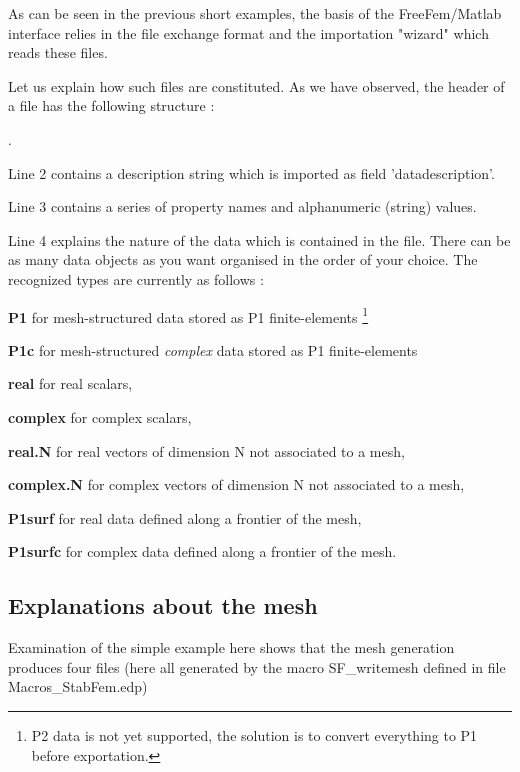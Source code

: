 As can be seen in the previous short examples, the basis of the FreeFem/Matlab interface relies in the file exchange format 
and the importation "wizard"   which reads these files.

Let us explain how such files are constituted. As we have observed, the header of a  file has the following structure :

.

Line 2 contains a description string which is imported as field 'datadescription'.

Line 3 contains a series of property names and alphanumeric (string) values.


Line 4 explains the nature of the data which is contained in the file.
There can be as many data objects as you want organised in the order of your choice. The recognized types are currently as follows :
\begin{description}
\item{ \bf P1}  for mesh-structured data stored as P1 finite-elements
\footnote{P2 data is not yet supported, the solution is to convert everything to P1 before exportation.}  
\item{\bf P1c}  for mesh-structured {\em complex} data stored as P1 finite-elements
\item{\bf real} for real scalars,
\item{\bf complex} for complex scalars,
\item{\bf real.N} for real vectors of dimension N not associated to a mesh,
\item{\bf complex.N} for complex vectors of dimension N not associated to a mesh,
\item{\bf P1surf} for real data defined along a frontier of the mesh,
\item{\bf P1surfc} for complex data defined along a frontier of the mesh.
\end{description}

\subsection{Explanations about the mesh }

Examination of the simple example here shows that the mesh generation produces four files (here all generated by the macro SF\_writemesh defined
in file Macros\_StabFem.edp)

